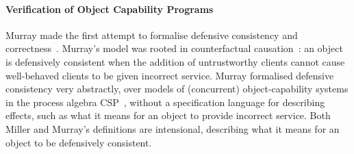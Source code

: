 


\paragraph{Verification of Object Capability Programs}

Murray made the first attempt to formalise defensive consistency and
correctness~\cite{Murray10dphil}.  Murray's model was rooted in
counterfactual causation~\cite{Lewis_73}: an object is defensively
consistent when the addition of untrustworthy clients cannot cause
well-behaved clients to be given incorrect service.  Murray formalised
defensive consistency very abstractly, over models of (concurrent)
object-capability systems in the process algebra CSP~\cite{Hoare:CSP},
without a specification language for describing effects, such as what
it means for an object to provide incorrect service.  Both Miller and
Murray's definitions are intensional, describing what it means for an
object to be defensively consistent.


